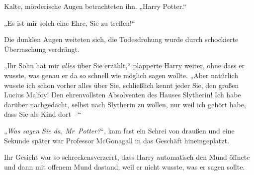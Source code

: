 Kalte, mörderische Augen betrachteten ihn. „Harry Potter.“

„Es ist mir solch eine Ehre, Sie zu treffen!“

Die dunklen Augen weiteten sich, die Todesdrohung wurde durch schockierte Überraschung verdrängt.

„Ihr Sohn hat mir \emph{alles} über Sie erzählt,“ plapperte Harry weiter, ohne dass er wusste, was genau er da so schnell wie möglich sagen wollte. „Aber natürlich wusste ich schon vorher alles über Sie, schließlich kennt jeder Sie, den großen Lucius Malfoy! Den ehrenvollsten Absolventen des Hauses Slytherin! Ich habe darüber nachgedacht, selbst nach Slytherin zu wollen, nur weil ich gehört habe, dass Sie als Kind dort –“

„\emph{Was sagen Sie da, Mr~Potter?}“, kam fast ein Schrei von draußen und eine Sekunde später war Professor McGonagall in das Geschäft hineingeplatzt.

Ihr Gesicht war so schreckensverzerrt, dass Harry automatisch den Mund öffnete und dann mit offenem Mund dastand, weil er nicht wusste, was er sagen sollte.


